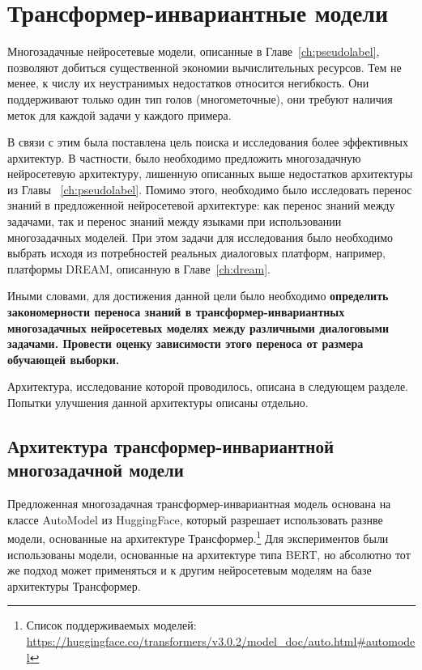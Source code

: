 \chapter{Трансформер-инвариантные модели}\label{ch:tr-ag}
Многозадачные нейросетевые модели, описанные в Главе~\ref{ch:pseudolabel}, позволяют добиться существенной экономии вычислительных ресурсов. Тем не менее, к числу их неустранимых недостатков относится негибкость. Они поддерживают только один тип голов (многометочные), они требуют наличия меток для каждой задачи у каждого примера.

В связи с этим была поставлена цель поиска и исследования более эффективных архитектур. В частности, было необходимо предложить многозадачную нейросетевую архитектуру, лишенную описанных выше недостатков архитектуры из Главы ~\ref{ch:pseudolabel}. Помимо этого, необходимо было исследовать перенос знаний в предложенной нейросетевой архитектуре: как перенос знаний между задачами, так и перенос знаний между языками при использовании многозадачных моделей. При этом задачи для исследования было необходимо выбрать исходя из потребностей реальных диалоговых платформ, например, платформы DREAM, описанную в Главе~\ref{ch:dream}. 

Иными словами, для достижения данной цели было необходимо \textbf{определить закономерности переноса знаний в трансформер-инвариантных многозадачных нейросетевых моделях между различными диалоговыми задачами. Провести оценку зависимости этого переноса от размера обучающей выборки.}


Архитектура, исследование которой проводилось, описана в следующем разделе. Попытки улучшения данной архитектуры описаны отдельно. 

\section{Архитектура трансформер-инвариантной многозадачной модели}\label{ch:tr-ag:architecture}
Предложенная многозадачная трансформер-инвариантная модель основана на классе {AutoModel} из HuggingFace, который разрешает использовать разнве модели, основанные на архитектуре Трансформер.\footnote{Список поддерживаемых моделей: \url{https://huggingface.co/transformers/v3.0.2/model_doc/auto.html\#automodel}} Для экспериментов были использованы модели, основанные на архитектуре типа BERT, но абсолютно тот же подход может применяться и к другим нейросетевым моделям на базе архитектуры Трансформер.

